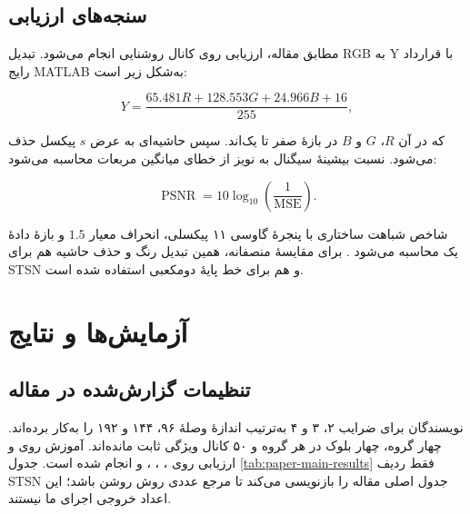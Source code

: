 \section{سنجه‌های ارزیابی}

مطابق مقاله، ارزیابی روی کانال روشنایی انجام می‌شود. تبدیل RGB به Y با قرارداد رایج MATLAB به‌شکل زیر است:

\begin{equation}
Y=\frac{65.481R+128.553G+24.966B+16}{255},
\end{equation}

که در آن $R$، $G$ و $B$ در بازهٔ صفر تا یک‌اند. سپس حاشیه‌ای به عرض $s$ پیکسل حذف می‌شود. نسبت بیشینهٔ سیگنال به نویز از خطای میانگین مربعات محاسبه می‌شود:

\begin{equation}
\operatorname{PSNR}=10\log_{10}\left(\frac{1}{\operatorname{MSE}}\right).
\end{equation}

شاخص شباهت ساختاری با پنجرهٔ گاوسی ۱۱ پیکسلی، انحراف معیار $1.5$ و بازهٔ دادهٔ یک محاسبه می‌شود \cite{Wang2004}. برای مقایسهٔ منصفانه، همین تبدیل رنگ و حذف حاشیه هم برای STSN و هم برای خط پایهٔ دو‌مکعبی استفاده شده است.

\chapter{آزمایش‌ها و نتایج}

\section{تنظیمات گزارش‌شده در مقاله}

نویسندگان برای ضرایب ۲، ۳ و ۴ به‌ترتیب اندازهٔ وصلهٔ ۹۶، ۱۴۴ و ۱۹۲ را به‌کار برده‌اند. چهار گروه، چهار بلوک در هر گروه و ۵۰ کانال ویژگی ثابت مانده‌اند. آموزش روی  و ارزیابی روی ، ، ،  و  انجام شده است. جدول \ref{tab:paper-main-results} فقط ردیف STSN جدول اصلی مقاله را بازنویسی می‌کند تا مرجع عددی روش روشن باشد؛ این اعداد خروجی اجرای ما نیستند.

\begin{table}[H]
\centering
\caption{نتایج STSN گزارش‌شده در مقاله؛ هر خانه به‌ترتیب PSNR برحسب دسی‌بل و SSIM را نشان می‌دهد}
\label{tab:paper-main-results}
\end{table}

